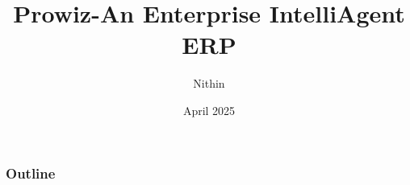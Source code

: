 \documentclass{beamer}
\title[Prowiz]{Prowiz-An Enterprise IntelliAgent ERP}
\author[Nithin]{Nithin}
\institute[Nithin]{A collaborative effort of \textbf{Dhvani-AI}, \textbf{Cortez}, \textbf{Kavin}}
\date{April 2025}
\begin{document}
\begin{frame}
  \titlepage
\end{frame}

\begin{frame}
  \frametitle{Outline}
  \tableofcontents
\end{frame}

    













\end{document}
